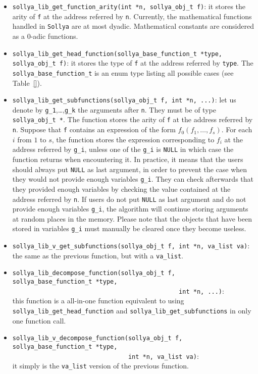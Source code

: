 \documentclass[a4paper]{article}
\newcommand{\sollya}{\texttt{Sollya}\xspace}
\begin{document}
\begin{itemize}
\item \verb|sollya_lib_get_function_arity(int *n, sollya_obj_t f)|: it stores the arity of \texttt{f} at the address referred by \texttt{n}. Currently, the mathematical functions handled in \sollya are at most dyadic. Mathematical constants are considered as a 0-adic functions.
\item \verb|sollya_lib_get_head_function(sollya_base_function_t *type, sollya_obj_t f)|: it stores the type of \texttt{f} at the address referred by \texttt{type}. The \texttt{sollya\_base\_function\_t} is an enum type listing all possible cases (see Table~\ref{}).
\item \verb|sollya_lib_get_subfunctions(sollya_obj_t f, int *n, ...)|: let us denote by \texttt{g\_1},\dots,\texttt{g\_k} the arguments after \texttt{n}. They must be of type \verb|sollya_obj_t *|. The function stores the arity of \texttt{f} at the address referred by \texttt{n}. Suppose that \texttt{f} contains an expression of the form $f_0(f_1,\dots,f_s)$. For each $i$ from $1$ to $s$, the function stores the expression corresponding to $f_i$ at the address referred by \texttt{g\_i}, unless one of the \texttt{g\_i} is \texttt{NULL} in which case the function returns when encountering it. In practice, it means that the users should always put \texttt{NULL} as last argument, in order to prevent the case when they would not provide enough variables \texttt{g\_i}. They can check afterwards that they provided enough variables by checking the value contained at the address referred by \texttt{n}. If users do not put \texttt{NULL} as last argument and do not provide enough variables \texttt{g\_i}, the algorithm will continue storing arguments at random places in the memory. Please note that the objects that have been stored in variables \texttt{g\_i} must manually be cleared once they become useless.
\item \verb|sollya_lib_v_get_subfunctions(sollya_obj_t f, int *n, va_list va)|: the same as the previous function, but with a \texttt{va\_list}.
\item \verb|sollya_lib_decompose_function(sollya_obj_t f, sollya_base_function_t *type,|\\
      \verb|                                              int *n, ...)|:\\
this function is a all-in-one function equivalent to using \verb|sollya_lib_get_head_function| and \verb|sollya_lib_get_subfunctions| in only one function call.
\item \verb|sollya_lib_v_decompose_function(sollya_obj_t f, sollya_base_function_t *type,|\\
      \verb|                                int *n, va_list va)|:\\
 it simply is the \texttt{va\_list} version of the previous function.
\end{itemize}
\end{document}
